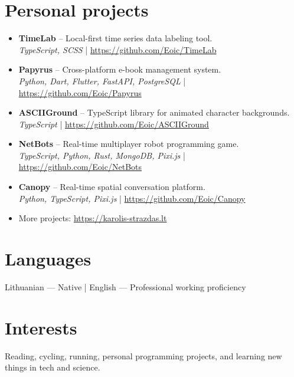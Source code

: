 \documentclass[10pt,a4paper]{article}
\newcommand{\techstack}[1]{\textcolor{black!70}{\small\textit{#1}}}
\begin{document}
\section*{Personal projects}
\begin{itemize}[leftmargin=*,itemsep=0.08em,topsep=0.08em]
  \item \textbf{TimeLab} -- Local-first time series data labeling tool.\\
      \techstack{TypeScript, SCSS} | \url{https://github.com/Eoic/TimeLab}
  \item \textbf{Papyrus} -- Cross-platform e-book management system.\\
      \techstack{Python, Dart, Flutter, FastAPI, PostgreSQL} | \url{https://github.com/Eoic/Papyrus}
  \item \textbf{ASCIIGround} -- TypeScript library for animated character backgrounds.\\
      \techstack{TypeScript} | \url{https://github.com/Eoic/ASCIIGround}
  \item \textbf{NetBots} -- Real-time multiplayer robot programming game.\\
      \techstack{TypeScript, Python, Rust, MongoDB, Pixi.js} | \url{https://github.com/Eoic/NetBots}
  \item \textbf{Canopy} -- Real-time spatial conversation platform.\\
      \techstack{Python, TypeScript, Pixi.js} | \url{https://github.com/Eoic/Canopy}
  \item More projects: \url{https://karolis-strazdas.lt}
\end{itemize}

\section*{Languages}
Lithuanian — Native \;\;|\;\; English — Professional working proficiency

\section*{Interests}
Reading, cycling, running, personal programming projects, and learning new things in tech and science.

\endgroup
\end{document}

